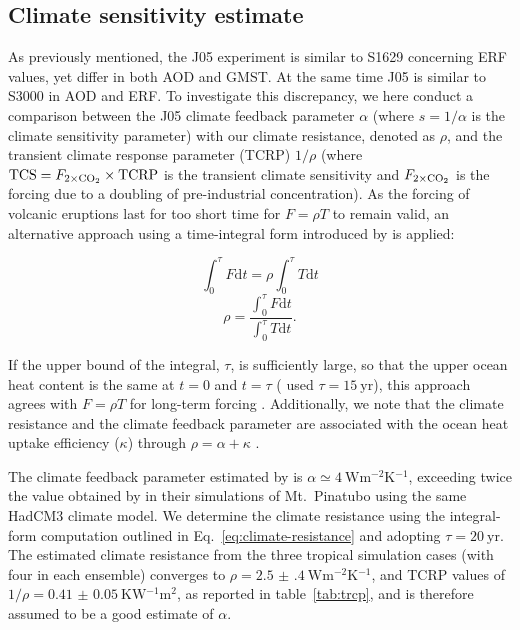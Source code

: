 \documentclass[draft]{agujournal2019}
\begin{document}
  \subsection{Climate sensitivity estimate}

  As previously mentioned, the J05 experiment is similar to S1629 concerning ERF values,
  yet differ in both AOD and GMST. At the same time J05 is similar to S3000 in AOD and
  ERF. To investigate this discrepancy, we here conduct a comparison between the J05
  climate feedback parameter \(\alpha\) (where \(s=1/\alpha\) is the climate sensitivity
  parameter) with our climate resistance, denoted as \(\rho\), and the transient climate
  response parameter (TCRP) \(1/\rho\) (where \(\mathrm{TCS}=F_{2\times\ce{CO2}}\times
  \mathrm{TCRP}\) is the transient climate sensitivity and \(F_{2\times\ce{CO2}}\) is
  the forcing due to a doubling of pre-industrial  concentration).
   As the forcing of volcanic eruptions last for too short time
  for \(F=\rho T\) to remain valid, an alternative approach using a time-integral form
  introduced by  is applied:

  \begin{equation}
    \int_0^{\tau}F \mathrm{d}t=\rho\int_{0}^{\tau}T \mathrm{d}t
    \label{eq:climate-resistance-orig}
  \end{equation}
  \begin{equation}
    \rho=\frac{\int_0^{\tau}F \mathrm{d}t}{\int_{0}^{\tau}T \mathrm{d}t}.
    \label{eq:climate-resistance}
  \end{equation}

  If the upper bound of the integral, \(\tau\), is sufficiently large, so that the upper
  ocean heat content is the same at \(t=0\) and \(t=\tau\) ( used
  \(\tau =\SI{15}{\mathrm{yr}}\)), this approach agrees with \(F=\rho T\) for long-term
  forcing \cite{gregory2016}. Additionally, we note that the climate resistance and the
  climate feedback parameter are associated with the ocean heat uptake efficiency
  (\(\kappa\)) through \(\rho =\alpha +\kappa\) \cite{gregory2016}.

  The climate feedback parameter estimated by  is \(\alpha \simeq
  \SI{4}{\watt\metre^{-2}\kelvin^{-1}}\), exceeding twice the value obtained by
   in their simulations of Mt.\ Pinatubo using the same HadCM3
  climate model. We determine the climate resistance using the integral-form computation
  outlined in Eq.~\ref{eq:climate-resistance} and adopting \(\tau
  =\SI{20}{\mathrm{yr}}\). The estimated climate resistance from the three tropical
  simulation cases (with four in each ensemble) converges to \(\rho
  =\SI{2.5(4)}{\watt\metre^{-2}\kelvin^{-1}}\), and TCRP values of
  \(1/\rho=\SI{0.41(5)}{\kelvin\watt^{-1}\metre^{2}}\), as reported in
  table~\ref{tab:trcp}, and is therefore assumed to be a good estimate of \(\alpha\).
\end{document}
